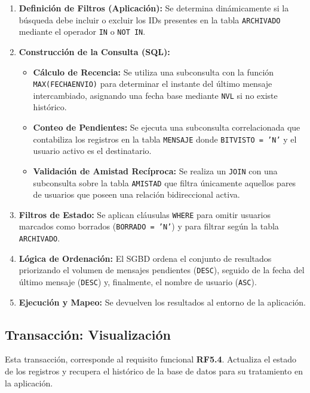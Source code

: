 \begin{enumerate}
    \item \textbf{Definición de Filtros (Aplicación):} Se determina dinámicamente si la búsqueda debe incluir o excluir los IDs presentes en la tabla \texttt{ARCHIVADO} mediante el operador \texttt{IN} o \texttt{NOT IN}.
    \item \textbf{Construcción de la Consulta (SQL):}
    \begin{itemize}
        \item \textbf{Cálculo de Recencia:} Se utiliza una subconsulta con la función \texttt{MAX(FECHAENVIO)} para determinar el instante del último mensaje intercambiado, asignando una fecha base mediante \texttt{NVL} si no existe histórico.
        \item \textbf{Conteo de Pendientes:} Se ejecuta una subconsulta correlacionada que contabiliza los registros en la tabla \texttt{MENSAJE} donde \texttt{BITVISTO = 'N'} y el usuario activo es el destinatario.
        \item \textbf{Validación de Amistad Recíproca:} Se realiza un \texttt{JOIN} con una subconsulta sobre la tabla \texttt{AMISTAD} que filtra únicamente aquellos pares de usuarios que poseen una relación bidireccional activa.
    \end{itemize}
    \item \textbf{Filtros de Estado:} Se aplican cláusulas \texttt{WHERE} para omitir usuarios marcados como borrados (\texttt{BORRADO = 'N'}) y para filtrar según la tabla \texttt{ARCHIVADO}.
    \item \textbf{Lógica de Ordenación:} El SGBD ordena el conjunto de resultados priorizando el volumen de mensajes pendientes (\texttt{DESC}), seguido de la fecha del último mensaje (\texttt{DESC}) y, finalmente, el nombre de usuario (\texttt{ASC}).
    \item \textbf{Ejecución y Mapeo:} Se devuelven los resultados al entorno de la aplicación.
\end{enumerate}

\subsection{Transacción: Visualización}
Esta transacción, corresponde al requisito funcional \textbf{RF5.4}. Actualiza el estado de los registros y recupera el histórico de la base de datos para su tratamiento en la aplicación.

